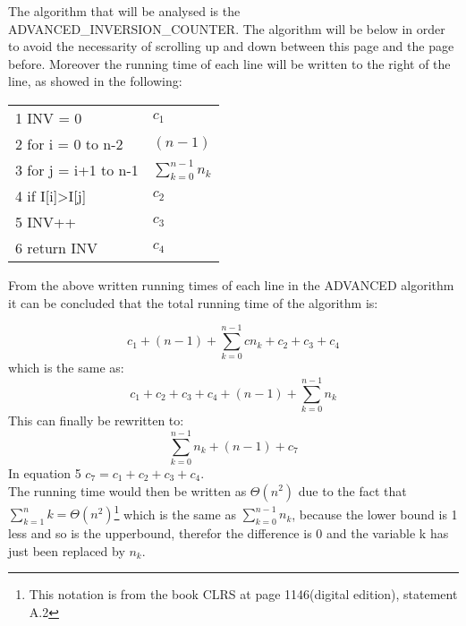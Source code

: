\documentclass[a4paper]{article}
\begin{document}
        The algorithm that will be analysed is the ADVANCED\_INVERSION\_COUNTER. The algorithm will be below in order to avoid the 
        necessarity of scrolling up and down between this page and the page before. Moreover the running time of each line will 
        be written to the right of the line, as showed in the following:

        \begin{table}[H]
            \begin{tabular}{l|l}
            1    INV = 0                                   & $c_1$     \\
            2    for i = 0 to n-2                          & $(n-1)$   \\
            3        for j = i+1 to n-1                    & $\sum_{k=0}^{n-1} n_k$ \\
            4            if I[i]>I[j]                      & $c_2$ \\
            5            INV++                             & $c_3$ \\
            6    return INV                                & $c_4$    
            \end{tabular}
        \end{table}

        \begin{flushleft}
            From the above written running times of each line in the ADVANCED algorithm it can be concluded that the total running time of the algorithm is:
        \end{flushleft}

        \begin{equation}
            c_1+(n-1)+\sum_{k=0}^{n-1}cn_k+c_2+c_3+c_4
        \end{equation}
        which is the same as:
        \begin{equation}
            c_1+c_2+c_3+c_4+(n-1)+\sum_{k=0}^{n-1} n_k
        \end{equation}
        This can finally be rewritten to:
        \begin{equation}
            \sum_{k=0}^{n-1} n_k+(n-1)+c_7
        \end{equation}
        In equation 5 $c_7=c_1+c_2+c_3+c_4$. \\
        The running time would then be written as $\Theta(n^2)$ due to the fact that $\sum_{k=1}^{n} k = \Theta(n^2)$\footnote{This notation is from the book CLRS at page 1146(digital edition), statement A.2} which is the same as $\sum_{k=0}^{n-1} n_k$, because the lower bound is 1 less and so is the upperbound, therefor the difference is 0 and the variable k has just been replaced by $n_k$.
\end{document}
